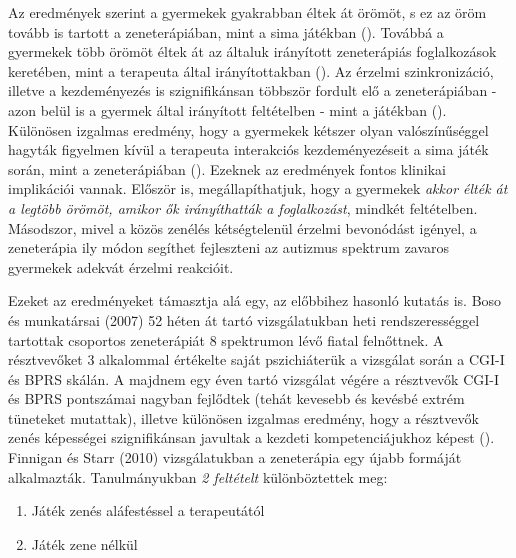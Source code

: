 Az eredmények szerint a gyermekek gyakrabban éltek át örömöt, s ez az öröm tovább is tartott a zeneterápiában, mint a sima játékban (\cite{kim_wigram_gold_2009}). Továbbá a gyermekek több örömöt éltek át az általuk irányított zeneterápiás foglalkozások keretében, mint a terapeuta által irányítottakban (\cite{kim_wigram_gold_2009}). Az érzelmi szinkronizáció, illetve a kezdeményezés is szignifikánsan többször fordult elő a zeneterápiában - azon belül is a gyermek által irányított feltételben - mint a játékban (\cite{kim_wigram_gold_2009}). Különösen izgalmas eredmény, hogy a gyermekek kétszer olyan valószínűséggel hagyták figyelmen kívül a terapeuta interakciós kezdeményezéseit a sima játék során, mint a zeneterápiában (\cite{kim_wigram_gold_2009}). Ezeknek az eredmények fontos klinikai implikációi vannak. Először is, megállapíthatjuk, hogy a gyermekek \textit{akkor élték át a legtöbb örömöt, amikor ők irányíthatták a foglalkozást}, mindkét feltételben. Másodszor, mivel a közös zenélés kétségtelenül érzelmi bevonódást igényel, a zeneterápia ily módon segíthet fejleszteni az autizmus spektrum zavaros gyermekek adekvát érzelmi reakcióit.

Ezeket az eredményeket támasztja alá egy, az előbbihez hasonló kutatás is. Boso és munkatársai (2007) 52 héten át tartó vizsgálatukban heti rendszerességgel tartottak csoportos zeneterápiát 8 spektrumon lévő fiatal felnőttnek. A résztvevőket 3 alkalommal értékelte saját pszichiáterük a vizsgálat során a CGI-I és BPRS skálán. A majdnem egy éven tartó vizsgálat végére a résztvevők CGI-I és BPRS pontszámai nagyban fejlődtek (tehát kevesebb és kevésbé extrém tüneteket mutattak), illetve különösen izgalmas eredmény, hogy a résztvevők zenés képességei szignifikánsan javultak a kezdeti kompetenciájukhoz képest (\cite{boso_emanuele_minazzi_abbamonte_politi_2007}). Finnigan és Starr (2010) vizsgálatukban a zeneterápia egy újabb formáját alkalmazták. Tanulmányukban \textit{2 feltételt} különböztettek meg:

\begin{enumerate}
	\item Játék zenés aláfestéssel a terapeutától
	\item Játék zene nélkül
\end{enumerate}  

